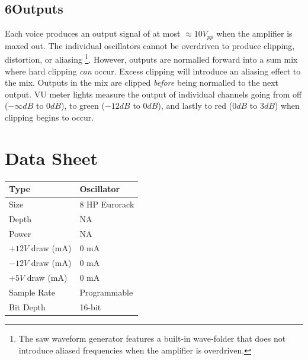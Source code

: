 \documentclass[12pt,letter]{article}
\begin{document}
\subsection*{6{\quad}Outputs}

Each voice produces an output signal of at most ${\approx}10V_{pp}$ when the amplifier is maxed out. The individual oscillators cannot be overdriven to produce clipping, distortion, or aliasing \footnote{The saw waveform generator features a built-in wave-folder that does not introduce aliased frequencies when the amplifier is overdriven.}. However, outputs are normalled forward into a sum mix where hard clipping \textit{can} occur. Excess clipping will introduce an aliasing effect to the mix. Outputs in the mix are clipped \textit{before} being normalled to the next output. VU meter lights measure the output of individual channels going from off ($-\infty dB$ to $0dB$), to green ($-12dB$ to $0dB$), and lastly to red ($0dB$ to $3dB$) when clipping begins to occur.


\clearpage
\section*{Data Sheet}

\begin{table}[!htp]
\begin{tabular}{|l|l|}
\hline
Type             & Oscillator               \\
\hline
Size             & 8  HP Eurorack           \\
\hline
Depth            & NA                       \\
\hline
Power            & NA                       \\ %
\hline
$+12V$ draw (mA) & 0 mA                     \\
\hline
$-12V$ draw (mA) & 0 mA                     \\
\hline
$+5V$ draw (mA)  & 0 mA                     \\
\hline
Sample Rate      & Programmable             \\
\hline
Bit Depth        & 16-bit                   \\
\hline
\end{tabular}
\end{table}


\clearpage
\renewcommand\refname{References \& Acknowledgments}
\nocite{*}


\end{document}
